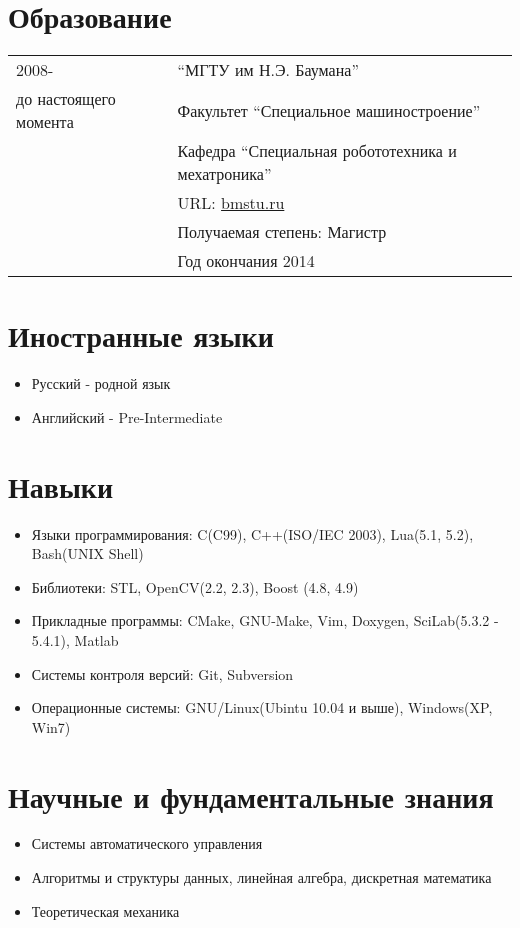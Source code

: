 \documentclass[a4paper, 11pt]{article}
\begin{document}
\section{Образование}
\begin{tabular}{p{25mm}|p{110mm}}
2008-                 & ``МГТУ им Н.Э. Баумана'' \\ 
до настоящего момента & Факультет ``Специальное машиностроение'' \\
                      & Кафедра ``Специальная робототехника и мехатроника'' \\
                      & URL: \href{http://bmstu.ru}{bmstu.ru} \\
                      & Получаемая степень: Магистр \\
                      & Год окончания 2014
\end{tabular}

\section{Иностранные языки}
\begin{itemize}
    \item Русский    - родной язык
    \item Английский - Pre-Intermediate
\end{itemize}

\section{Навыки}
\begin{itemize}
    \item Языки программирования:   C(C99), C++(ISO/IEC 2003), Lua(5.1, 5.2), Bash(UNIX Shell)
    \item Библиотеки:               STL, OpenCV(2.2, 2.3), Boost (4.8, 4.9)
    \item Прикладные программы:     CMake, GNU-Make, Vim, Doxygen, SciLab(5.3.2 - 5.4.1), Matlab
    \item Системы контроля версий:  Git, Subversion
    \item Операционные системы:     GNU/Linux(Ubintu 10.04 и выше), Windows(XP, Win7)
\end{itemize}

\section{Научные и фундаментальные знания}
\begin{itemize}
    \item Системы автоматического управления
    \item Алгоритмы и структуры данных, линейная алгебра, дискретная математика
    \item Теоретическая механика
\end{itemize}
\end{document}

